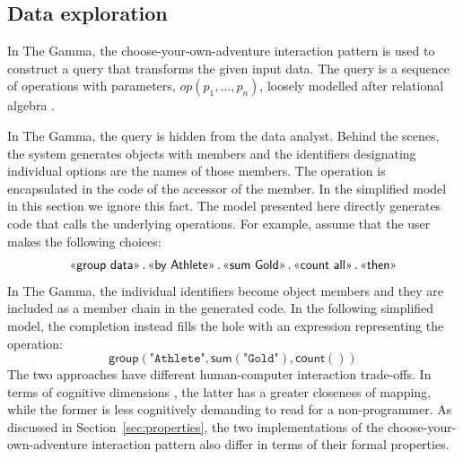\documentclass[a4paper,UKenglish,cleveref, autoref, thm-restate]{lipics-v2021}
\newcommand{\ident}[1]{\textsf{#1}}
\newcommand{\ddident}[1]{\guillemotleft\ident{#1}\guillemotright}
\newcommand{\op}{\textit{op}}
\begin{document}
\subsection{Data exploration}
\label{sec:examples-data}

In The Gamma, the choose-your-own-adventure interaction pattern is used to construct a
query that transforms the given input data. The query is a sequence of operations with parameters,
$\op(p_1, \ldots, p_n)$, loosely modelled after relational algebra \cite{codd-1970-relational}.

In The Gamma, the query is hidden from the data analyst. Behind the scenes, the system generates
objects with members and the identifiers designating individual options are the names of those
members. The operation is encapsulated in the code of the accessor of the member. In the
simplified model in this section we ignore this fact. The model presented here directly
generates code that calls the underlying operations. For example, assume that the user makes
the following choices:
\[
\textnormal{\ddident{group data}\,.\,\ddident{by Athlete}\,.\,\ddident{sum Gold}\,.\,\ddident{count all}\,.\,\ddident{then}}
\]
In The Gamma, the individual identifiers become object members and they are included as
a member chain in the generated code. In the following simplified model, the completion
instead fills the hole with an expression representing the operation:
\[
\ident{group}(\texttt{"Athlete"}, \ident{sum}(\texttt{"Gold"}), \ident{count}())
\]
The two approaches have different human-computer interaction trade-offs. In terms of cognitive
dimensions \cite{green-1989-cogdims,blackwell-2003-cogdims}, the latter has a greater closeness
of mapping, while the former is less cognitively demanding to read for a non-programmer.
As discussed in Section~\ref{sec:properties}, the two implementations of the choose-your-own-adventure
interaction pattern also differ in terms of their formal properties.
\end{document}

